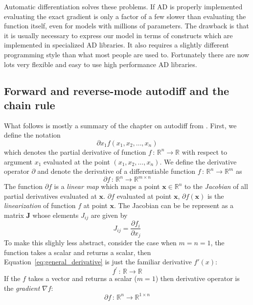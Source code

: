 \documentclass[12pt,dvipsnames]{report}
\renewcommand{\vec}[1]{\boldsymbol{\mathbf{#1}}}
\begin{document}
Automatic differentiation solves these problems. If AD is properly implemented 
evaluating the exact gradient is only a factor of a few slower than evaluating 
the function itself, even for models with millions of parameters.
The drawback is that it is usually
necessary to express our model in terms of constructs which are implemented in 
specialized AD libraries. It also requires a slightly different programming style
than what most people are used to. Fortunately there are now lots very flexible 
and easy to use high performance AD libraries. 

\subsection{Forward and reverse-mode autodiff and the chain rule}
What follows is mostly a summary of the chapter on autodiff 
from \citet{murphy_book_2023}. First, we define the notation
\begin{equation}
\partial x_1 f\left(x_{1}, x_{2}, \ldots, x_{n}\right)
\end{equation} 
which denotes the partial derivative of function 
$f\,:\,\mathbb{R}^{n} \rightarrow \mathbb{R}$ with respect to argument $x_1$ 
evaluated at the point $(x_{1}, x_{2}, \ldots, x_{n})$.
We define the derivative operator $\partial$ and denote the derivative of a 
differentiable function $f\,:\,\mathbb{R}^{n} \rightarrow \mathbb{R}^m$ as 
\begin{equation}
    \partial f\,:\,\mathbb{R}^{n} \rightarrow \mathbb{R}^{m\times n}
    \label{eq:general_derivative}
\end{equation}
The function $\partial f$ is a \textsl{linear map} which maps a point 
$\vec x\in \mathbb{R}^n$ to the \textsl{Jacobian} of all partial derivatives 
evaluated at $\vec x$.  $\partial f$ evaluated at point $\vec x$,
$\partial f (\vec x)$ is the \textsl{linearization} of function $f$ at point $\vec x$.
The Jacobian can be be represent as a matrix $\vec J$ whose 
elements $J_{ij}$ are given by 
\begin{equation}
J_{i j}=\frac{\partial f_{i}}{\partial x_{j}}
\end{equation}
  To make this slighly less abstract, consider the case when
$m=n=1$, the function takes a scalar and returns a scalar, then 
Equation~\ref{eq:general_derivative} is just the familiar derivative $f'(x)$:
\begin{equation}
    f^\prime\,:\,\mathbb{R} \rightarrow \mathbb{R}
\end{equation}
If the $f$ takes a vector and returns a scalar ($m=1$) then derivative operator is 
the \textsl{gradient} $\nabla f$:
\begin{equation}
    \partial f\,:\,\mathbb{R}^{n} \rightarrow \mathbb{R}^{1\times n}
\end{equation}
\end{document}
